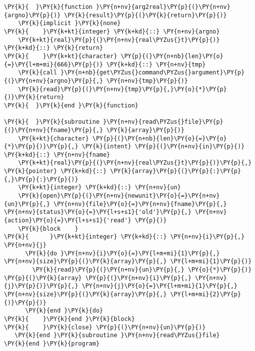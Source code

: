 \begin{Verbatim}[commandchars=\\\{\}]
\PY{k}{  }\PY{k}{function }\PY{n+nv}{arg2real}\PY{p}{(}\PY{n+nv}{argno}\PY{p}{)} \PY{k}{result}\PY{p}{(}\PY{k}{return}\PY{p}{)}
    \PY{k}{implicit }\PY{k}{none}
\PY{k}{    }\PY{k+kt}{integer} \PY{k+kd}{::} \PY{n+nv}{argno}
    \PY{k+kt}{real}\PY{p}{(}\PY{n+nv}{real\PYZus{}t}\PY{p}{)} \PY{k+kd}{::} \PY{k}{return}
\PY{k}{    }\PY{k+kt}{character} \PY{p}{(}\PY{n+nb}{len}\PY{o}{=}\PY{l+m+mi}{666}\PY{p}{)} \PY{k+kd}{::} \PY{n+nv}{tmp}
    \PY{k}{call }\PY{n+nb}{get\PYZus{}command\PYZus{}argument}\PY{p}{(}\PY{n+nv}{argno}\PY{p}{,} \PY{n+nv}{tmp}\PY{p}{)}
    \PY{k}{read}\PY{p}{(}\PY{n+nv}{tmp}\PY{p}{,}\PY{o}{*}\PY{p}{)}\PY{k}{return}
\PY{k}{  }\PY{k}{end }\PY{k}{function}

\PY{k}{  }\PY{k}{subroutine }\PY{n+nv}{read\PYZus{}file}\PY{p}{(}\PY{n+nv}{fname}\PY{p}{,} \PY{k}{array}\PY{p}{)}
    \PY{k+kt}{character} \PY{p}{(}\PY{n+nb}{len}\PY{o}{=}\PY{o}{*}\PY{p}{)}\PY{p}{,} \PY{k}{intent} \PY{p}{(}\PY{n+nv}{in}\PY{p}{)} \PY{k+kd}{::} \PY{n+nv}{fname}
    \PY{k+kt}{real}\PY{p}{(}\PY{n+nv}{real\PYZus{}t}\PY{p}{)}\PY{p}{,} \PY{k}{pointer} \PY{k+kd}{::} \PY{k}{array}\PY{p}{(}\PY{p}{:}\PY{p}{,}\PY{p}{:}\PY{p}{)}
    \PY{k+kt}{integer} \PY{k+kd}{::} \PY{n+nv}{un}
    \PY{k}{open}\PY{p}{(}\PY{n+nv}{newunit}\PY{o}{=}\PY{n+nv}{un}\PY{p}{,} \PY{n+nv}{file}\PY{o}{=}\PY{n+nv}{fname}\PY{p}{,} \PY{n+nv}{status}\PY{o}{=}\PY{l+s+s1}{'old'}\PY{p}{,} \PY{n+nv}{action}\PY{o}{=}\PY{l+s+s1}{'read'} \PY{p}{)}
    \PY{k}{block    }
\PY{k}{      }\PY{k+kt}{integer} \PY{k+kd}{::} \PY{n+nv}{i}\PY{p}{,} \PY{n+nv}{j}
      \PY{k}{do }\PY{n+nv}{i}\PY{o}{=}\PY{l+m+mi}{1}\PY{p}{,} \PY{n+nv}{size}\PY{p}{(}\PY{k}{array}\PY{p}{,} \PY{l+m+mi}{1}\PY{p}{)}
        \PY{k}{read}\PY{p}{(}\PY{n+nv}{un}\PY{p}{,} \PY{o}{*}\PY{p}{)} \PY{p}{(}\PY{k}{array} \PY{p}{(}\PY{n+nv}{i}\PY{p}{,} \PY{n+nv}{j}\PY{p}{)}\PY{p}{,} \PY{n+nv}{j}\PY{o}{=}\PY{l+m+mi}{1}\PY{p}{,} \PY{n+nv}{size}\PY{p}{(}\PY{k}{array}\PY{p}{,} \PY{l+m+mi}{2}\PY{p}{)}\PY{p}{)}
      \PY{k}{end }\PY{k}{do}
\PY{k}{    }\PY{k}{end }\PY{k}{block}
\PY{k}{    }\PY{k}{close} \PY{p}{(}\PY{n+nv}{un}\PY{p}{)}
   \PY{k}{end }\PY{k}{subroutine }\PY{n+nv}{read\PYZus{}file}
\PY{k}{end }\PY{k}{program}
\end{Verbatim}
